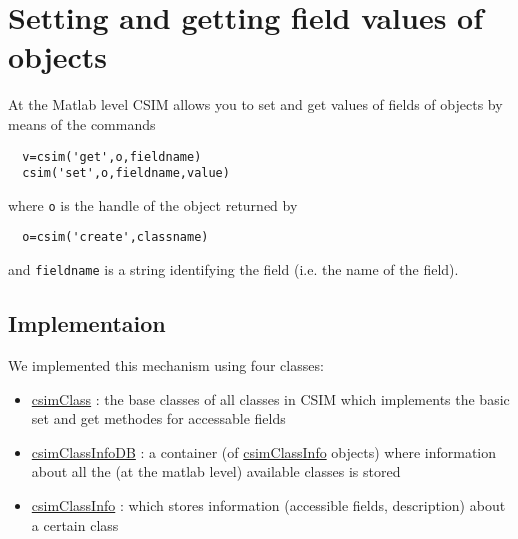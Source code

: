 \hypertarget{fields}{}\section{Setting and getting field values of objects}\label{fields}
At the Matlab level CSIM allows you to set and get values of fields of objects by means of the commands



\footnotesize\begin{verbatim}  v=csim('get',o,fieldname)
  csim('set',o,fieldname,value)
\end{verbatim}
\normalsize


where {\tt o} is the handle of the object returned by



\footnotesize\begin{verbatim}  o=csim('create',classname)
\end{verbatim}
\normalsize


and {\tt fieldname} is a string identifying the field (i.e. the name of the field).\hypertarget{fields_fields_implementation}{}\subsection{Implementaion}\label{fields_fields_implementation}
We implemented this mechanism using four classes:

\begin{itemize}
\item \hyperlink{classcsimClass}{csim\-Class} : the base classes of all classes in CSIM which implements the basic set and get methodes for accessable fields\end{itemize}


\begin{itemize}
\item \hyperlink{classcsimClassInfoDB}{csim\-Class\-Info\-DB} : a container (of \hyperlink{classcsimClassInfo}{csim\-Class\-Info} objects) where information about all the (at the matlab level) available classes is stored\end{itemize}


\begin{itemize}
\item \hyperlink{classcsimClassInfo}{csim\-Class\-Info} : which stores information (accessible fields, description) about a certain class\end{itemize}


